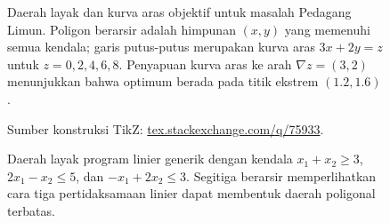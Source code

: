 \begin{solution}
\begin{figure}[H]
\caption{Daerah layak dan kurva aras objektif untuk masalah Pedagang Limun. Poligon berarsir adalah himpunan $(x,y)$ yang memenuhi semua kendala; garis putus-putus merupakan kurva aras $3x+2y = z$ untuk $z = 0,2,4,6,8$. Penyapuan kurva aras ke arah $\nabla z = (3,2)$ menunjukkan bahwa optimum berada pada titik ekstrem $(1.2,1.6)$.}
\label{fig:LemonadeVendorFeasibleRegion}
\end{figure}

\begin{figure}[H]
\centering
{}
\par\smallskip
{\footnotesize\raggedright Sumber konstruksi TikZ:
\href{https://tex.stackexchange.com/questions/75933/how-to-draw-the-region-of-inequality}{tex.stackexchange.com/q/75933}.\par}
\caption{Daerah layak program linier generik dengan kendala $x_1+x_2\geq 3$, $2x_1-x_2\leq 5$, dan $-x_1+2x_2\leq 3$. Segitiga berarsir memperlihatkan cara tiga pertidaksamaan linier dapat membentuk daerah poligonal terbatas.}
\label{fig:GenericThreeConstraintRegion}
\end{figure}
%


\end{solution}
